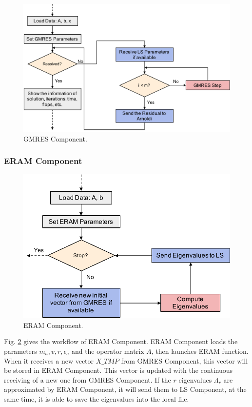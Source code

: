 \begin{figure}[htbp]
	\centering
	\includegraphics[width=6.2in]{fig/GMRES-component.pdf}
	\caption{GMRES Component.}
	\label{gmres-component}
\end{figure}

\subsubsection{ERAM Component}

\begin{figure}[htbp]
	\centering
	\includegraphics[width=4.8in]{fig/ERAM-component.pdf}
	\caption{ERAM Component.}
	\label{eram-component}
\end{figure}

Fig. \ref{eram-component} gives the workflow of ERAM Component. ERAM Component loads the parameters $m_a, v, r, \epsilon_a$ and the operator matrix $A$, then launches ERAM function. When it receives a new vector $X\_TMP$ from GMRES Component, this vector will be stored in ERAM Component. This vector is updated with the continuous receiving of a new one from GMRES Component. If the $r$ eigenvalues $\Lambda_r$ are approximated by ERAM Component, it will send them to LS Component, at the same time, it is able to save the eigenvalues into the local file.

